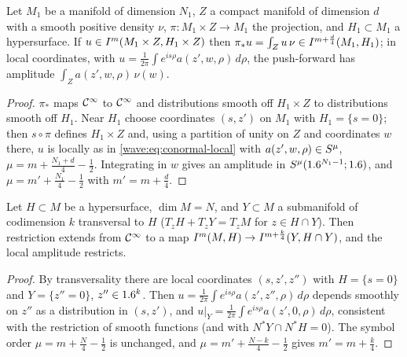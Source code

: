 \begin{proposition}\label{wave:prop:pushforward}
Let $M_1$ be a manifold of dimension $N_1$, $Z$ a compact manifold of dimension $d$
with a smooth positive density $\nu$, $\pi\colon M_1\times Z\to M_1$ the projection, and
$H_1\subset M_1$ a hypersurface. If $u\in I^{m}(M_1\times Z,H_1\times Z)$ then
$\pi_*u=\int_Zu\,\nu\in I^{m+\frac d4}(M_1,H_1)$; in local coordinates, with
$u=\frac1{2\pi}\int e^{is\rho}a(z',w,\rho)\,d\rho$, the push-forward has amplitude
$\int_Za(z',w,\rho)\,\nu(w)$.
\end{proposition}
\begin{proof}
$\pi_*$ maps $\mathcal{C}^\infty$ to $\mathcal{C}^\infty$ and distributions smooth off $H_1\times Z$ to
distributions smooth off $H_1$. Near $H_1$ choose coordinates $(s,z')$ on $M_1$ with
$H_1=\{s=0\}$; then $s\circ\pi$ defines $H_1\times Z$ and, using a partition of unity
on $Z$ and coordinates $w$ there, $u$ is locally as in \eqref{wave:eq:conormal-local}
with $a(z',w,\rho)\in S^{\mu}$, $\mu=m+\frac{N_1+d}4-\frac12$. Integrating in $w$
gives an amplitude in $S^{\mu}(1.6^{N_1-1};1.6)$, and $\mu=m'+\frac{N_1}4-\frac12$ with
$m'=m+\frac d4$.
\end{proof}

\begin{proposition}[Restriction]\label{wave:prop:restriction}
Let $H\subset M$ be a hypersurface, $\dim M=N$, and $Y\subset M$ a submanifold of
codimension $k$ transversal to $H$ ($T_zH+T_zY=T_zM$ for $z\in H\cap Y$). Then
restriction extends from $\mathcal{C}^\infty$ to a map
$I^{m}(M,H)\to I^{m+\frac k4}(Y,H\cap Y)$, and the local amplitude restricts.
\end{proposition}
\begin{proof}
By transversality there are local coordinates $(s,z',z'')$ with $H=\{s=0\}$ and
$Y=\{z''=0\}$, $z''\in1.6^k$. Then $u=\frac1{2\pi}\int e^{is\rho}a(z',z'',\rho)\,d\rho$ depends
smoothly on $z''$ as a distribution in $(s,z')$, and $u|_Y=\frac1{2\pi}\int e^{is\rho}a(z',0,\rho)\,d\rho$,
consistent with the restriction of smooth functions (and with $N^*Y\cap N^*H=0$).
The symbol order $\mu=m+\frac N4-\frac12$ is unchanged, and
$\mu=m'+\frac{N-k}4-\frac12$ gives $m'=m+\frac k4$.
\end{proof}

